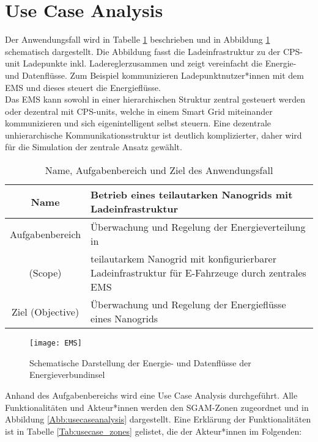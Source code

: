 	\section{Use Case Analysis}
		\label{Kap:Konzept_usecase}
			Der Anwendungsfall wird in Tabelle \ref{Tab:usecase} beschrieben und in Abbildung \ref{Abb:EMS} schematisch dargestellt. Die Abbildung fasst die Ladeinfrastruktur zu der CPS-unit \glqq Ladepunkte inkl. Laderegler\grqq zusammen und zeigt vereinfacht die Energie- und Datenflüsse. Zum Beispiel kommunizieren Ladepunktnutzer*innen mit dem EMS und dieses steuert die Energieflüsse. \\
            
            Das EMS kann sowohl in einer hierarchischen Struktur zentral gesteuert werden oder dezentral mit CPS-units, welche in einem Smart Grid miteinander kommunizieren und sich eigenintelligent selbst steuern. Eine dezentrale unhierarchische Kommunikationsstruktur ist deutlich komplizierter, daher wird für die Simulation der zentrale Ansatz gewählt. \\
            
		\begin{table}[h]
			\begin{tabularx}{\linewidth}{|c|X|}
				\hline 
				Name  		& Betrieb eines teilautarken Nanogrids mit Ladeinfrastruktur\\
				\hline 
				Aufgabenbereich 	& Überwachung und Regelung der Energieverteilung in\\
				(Scope) 			& teilautarkem Nanogrid mit konfigurierbarer Ladeinfrastruktur für E-Fahrzeuge durch zentrales EMS\\ 
				\hline 
				Ziel (Objective) 	& Überwachung und Regelung der Energieflüsse eines Nanogrids \\ 
				\hline
			\end{tabularx} 
			\caption{Name, Aufgabenbereich und Ziel des Anwendungsfall}
			\label{Tab:usecase}
		\end{table}
	
		\begin{figure}[h]
			\centering
			\texttt{[image: EMS]}
			\caption{Schematische Darstellung der Energie- und Datenflüsse der Energieverbundinsel}
			\label{Abb:EMS}
		\end{figure}
			
		Anhand des Aufgabenbereichs wird eine Use Case Analysis durchgeführt. Alle Funktionalitäten und Akteur*innen  werden den SGAM-Zonen zugeordnet und in Abbildung \ref{Abb:usecaseanalysis} dargestellt. Eine Erklärung der Funktionalitäten ist in Tabelle \ref{Tab:usecase_zones} gelistet, die der Akteur*innen im Folgenden:\\
		
